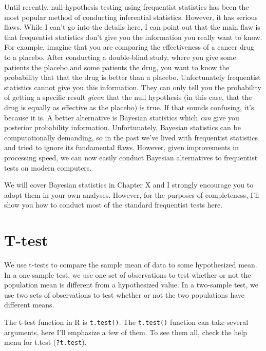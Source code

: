 \documentclass{tufte-book}\usepackage[]{graphicx}\usepackage[]{color}
\begin{document}
\begin{footnotesize}
Until recently, null-hypothesis testing using frequentist statistics has been the most popular method of conducting inferential statistics. However, it has serious flaws. While I can't go into the details here, I can point out that the main flaw is that frequentist statistics don't give you the information you really want to know. For example, imagine that you are comparing the effectiveness of a cancer drug to a placebo. After conducting a double-blind study, where you give some patients the placebo and some patients the drug, you want to know the probability that that the drug is better than a placebo. Unfortunately frequentist statistics cannot give you this information. They can only tell you the probability of getting a specific result \textit{given} that the null hypothesis (in this case, that the drug is equally as effective as the placebo) is true. If that sounds confusing, it's because it is. A better alternative is Bayesian statistics which \textit{can} give you posterior probability information. Unfortunately, Bayesian statistics can be computationally demanding, so in the past we've lived with frequentist statistics and tried to ignore its fundamental flaws. However, given improvements in processing speed, we can now easily conduct Bayesian alternatives to frequentist tests on modern computers.

We will cover Bayesian statistics in Chapter X and I strongly encourage you to adopt them in your own analyses. However, for the purposes of completeness, I'll show you how to conduct most of the standard frequentist tests here.

\section{T-test}


We use t-tests to compare the sample mean of data to some hypothesized mean. In a one sample test, we use one set of observations to test whether or not the population mean is different from a hypothesized value. In a two-sample test, we use two sets of observations to test whether or not the two populations have different means.

The t-test function in R is \texttt{t.test()}. The \texttt{t.test()} function can take several arguments, here I'll emphasize a few of them. To see them all, check the help menu for t.test (\texttt{?t.test}).



\end{footnotesize}
\end{document}
